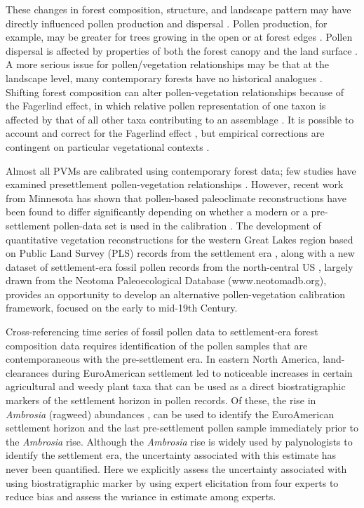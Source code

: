 \documentclass[12pt]{article}
\begin{document}
These changes in forest composition, structure, and landscape pattern
may have directly influenced pollen production and dispersal
\citep{kujawa2015}.  Pollen production, for example, may be greater
for trees growing in the open or at forest edges \citep{XXX}.  Pollen
dispersal is affected by properties of both the forest canopy and the
land surface \citep{jackson1999pollen}.  A more serious issue for
pollen/vegetation relationships may be that at the landscape level,
many contemporary forests have no historical analogues
\citep{goring_witness}. Shifting forest composition can alter
pollen-vegetation relationships because of the Fagerlind effect, in
which relative pollen representation of one taxon is affected by that
of all other taxa contributing to an assemblage
\citep{prentice1988records}. It is possible to account and correct for
the Fagerlind effect \citep{prentice1986, jackson1995exploration}, but
empirical corrections are contingent on particular vegetational
contexts \citep{jackson1998quantitative}.

Almost all PVMs are calibrated using contemporary forest data; few
studies have examined presettlement pollen-vegetation relationships
\citep{schwartz1989predicting}.  However, recent work from Minnesota
has shown that pollen-based paleoclimate reconstructions have been
found to differ significantly depending on whether a modern or a
pre-settlement pollen-data set is used in the calibration
\citep{st2014bias}.  The development of quantitative vegetation
reconstructions for the western Great Lakes region based on Public
Land Survey (PLS) records from the settlement era
\citep{goring_witness, bourdo1956review,
  schulte2001original, almendinger1996minnesota}, along with a new dataset of settlement-era
fossil pollen records from the north-central US \citep{kujawa2015},
largely drawn from the Neotoma Paleoecological Database
(www.neotomadb.org), provides an opportunity to develop an alternative
pollen-vegetation calibration framework, focused on the early to
mid-19th Century.

Cross-referencing time series of fossil pollen data to settlement-era
forest composition data requires identification of the pollen samples
that are contemporaneous with the pre-settlement era.  In eastern
North America, land-clearances during EuroAmerican settlement led to
noticeable increases in certain agricultural and weedy plant taxa that
can be used as a direct biostratigraphic markers of the settlement
horizon in pollen records.  Of these, the rise in \textit{Ambrosia}
(ragweed) abundances \citep{mcandrews1988human}, can be used to
identify the EuroAmerican settlement horizon and the last
pre-settlement pollen sample immediately prior to the
\textit{Ambrosia} rise. Although the \textit{Ambrosia} rise is widely
used by palynologists to identify the settlement era, the uncertainty
associated with this estimate has never been quantified.  Here we
explicitly assess the uncertainty associated with using
biostratigraphic marker by using expert elicitation from four experts
to reduce bias and assess the variance in estimate among experts.
\end{document}

